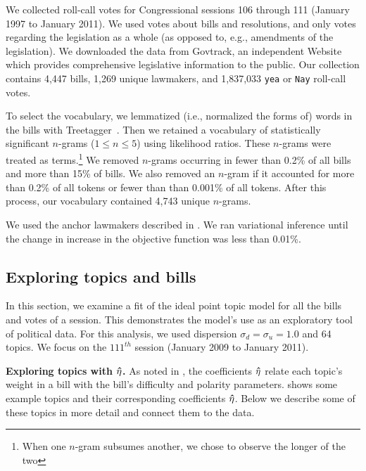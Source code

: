 We collected roll-call votes for Congressional sessions 106 through
111 (January 1997 to January 2011).  We used votes about bills and
resolutions, and only votes regarding the legislation as a whole
(as opposed to, e.g., amendments of the legislation). We downloaded
the data from Govtrack, an independent Website which provides
comprehensive legislative information to the public.  Our
collection contains 4,447 bills, 1,269 unique lawmakers, and
1,837,033 \verb!yea! or \verb!Nay! roll-call votes.

To select the vocabulary, we lemmatized (i.e., normalized the forms
of) words in the bills with Treetagger~\citep{treetagger}.  Then we
retained a vocabulary of statistically significant $n$-grams ($1 \le n
\le 5$) using likelihood ratios.  These $n$-grams were treated as
terms.\footnote{When one $n$-gram subsumes another, we chose to
  observe the longer of the two} We removed $n$-grams occurring in
fewer than 0.2\% of all bills and more than 15\% of bills.  We also
removed an $n$-gram if it accounted for more than 0.2\% of all tokens
or fewer than than 0.001\% of all tokens.  After this process, our
vocabulary contained 4,743 unique $n$-grams.

We used the anchor lawmakers described in .  We ran
variational inference until the change in increase in the objective
function was less than 0.01\%.

\subsection*{Exploring topics and bills}

In this section, we examine a fit of the ideal point topic model for
all the bills and votes of a session.  This demonstrates the model's
use as an exploratory tool of political data.  For this analysis, we
used dispersion $\sigma_d = \sigma_u = 1.0$ and 64 topics.  We focus
on the $111^{th}$ session (January 2009 to January 2011).

\textbf{Exploring topics with $\bm \hat \eta$.} As noted in , the
coefficients $\bm \hat \eta$ relate each topic's weight in a bill with the
bill's difficulty and polarity parameters.  shows
some example topics and their corresponding coefficients $\bm \hat \eta$.  Below
we describe some of these topics in more detail and connect them to
the data.

